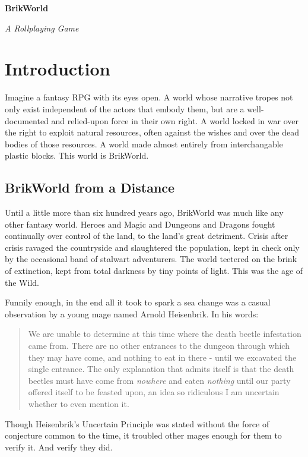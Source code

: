\documentclass[12pt,a4paper,twocolumn]{article}
\begin{document}

\setlength{\parindent}{0mm}
\setlength{\parskip}{0.5 cm} 

\begin{titlepage}
\Large
{\center \bf BrikWorld}

\normalfont
\begin{flushright}
  {\em A Rollplaying Game}
\end{flushright}
\vspace{1cm}
\end{titlepage}

\normalsize
\section{Introduction}
Imagine a fantasy RPG with its eyes open.  A world whose narrative tropes not only exist independent of the actors that embody them, but are a well-documented and relied-upon force in their own right.  A world locked in war over the right to exploit natural resources, often against the wishes and over the dead bodies of those resources.  A world made almost entirely from interchangable plastic blocks.  This world is BrikWorld. 
\subsection{BrikWorld from a Distance}
Until a little more than six hundred years ago, BrikWorld was much like any other fantasy world.  Heroes and Magic and Dungeons and Dragons fought continually over control of the land, to the land's great detriment.  Crisis after crisis ravaged the countryside and slaughtered the population, kept in check only by the occasional band of stalwart adventurers.  The world teetered on the brink of extinction, kept from total darkness by tiny points of light.  This was the age of the Wild.

Funnily enough, in the end all it took to spark a sea change was a casual observation by a young mage named Arnold Heisenbrik.  In his words:
\begin{quote}
We are unable to determine at this time where the death beetle infestation came from.  There are no other entrances to the dungeon through which they may have come, and nothing to eat in there - until we excavated the single entrance.  The only explanation that admits itself is that the death beetles must have come from {\em nowhere} and eaten {\em nothing} until our party offered itself to be feasted upon, an idea so ridiculous I am uncertain whether to even mention it.
\end{quote}
Though Heisenbrik's Uncertain Principle was stated without the force of conjecture common to the time, it troubled other mages enough for them to verify it.  And verify they did.
\end{document}
